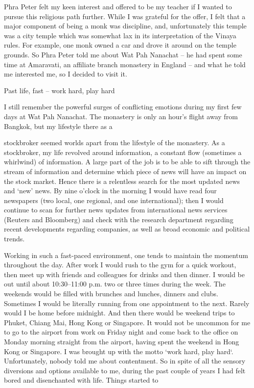 Phra Peter felt my keen interest and offered to be my teacher if I
wanted to pursue this religious path further. While I was grateful for
the offer, I felt that a major component of being a monk was discipline,
and, unfortunately this temple was a city temple which was somewhat lax
in its interpretation of the Vinaya rules. For example, one monk owned a
car and drove it around on the temple grounds. So Phra Peter told me
about Wat Pah Nanachat -- he had spent some time at Amaravati, an
affiliate branch monastery in England -- and what he told me interested
me, so I decided to visit it.

Past life, fast -- work hard, play hard

I still remember the powerful surges of conflicting emotions during my
first few days at Wat Pah Nanachat. The monastery is only an hour's
flight away from Bangkok, but my lifestyle there as a

stockbroker seemed worlds apart from the lifestyle of the monastery. As
a stockbroker, my life revolved around information, a constant flow
(sometimes a whirlwind) of information. A large part of the job is to be
able to sift through the stream of information and determine which piece
of news will have an impact on the stock market. Hence there is a
relentless search for the most updated news and `new' news. By nine
o'clock in the morning I would have read four newspapers (two local, one
regional, and one international); then I would continue to scan for
further news updates from international news services (Reuters and
Bloomberg) and check with the research department regarding recent
developments regarding companies, as well as broad economic and
political trends.

Working in such a fast-paced environment, one tends to maintain the
momentum throughout the day. After work I would rush to the gym for a
quick workout, then meet up with friends and colleagues for drinks and
then dinner. I would be out until about 10:30--11:00 p.m. two or three
times during the week. The weekends would be filled with brunches and
lunches, dinners and clubs. Sometimes I would be literally running from
one appointment to the next. Rarely would I be home before midnight. And
then there would be weekend trips to Phuket, Chiang Mai, Hong Kong or
Singapore. It would not be uncommon for me to go to the airport from
work on Friday night and come back to the office on Monday morning
straight from the airport, having spent the weekend in Hong Kong or
Singapore. I was brought up with the motto `work hard, play hard`.
Unfortunately, nobody told me about contentment. So in spite of all the
sensory diversions and options available to me, during the past couple
of years I had felt bored and disenchanted with life. Things started to


